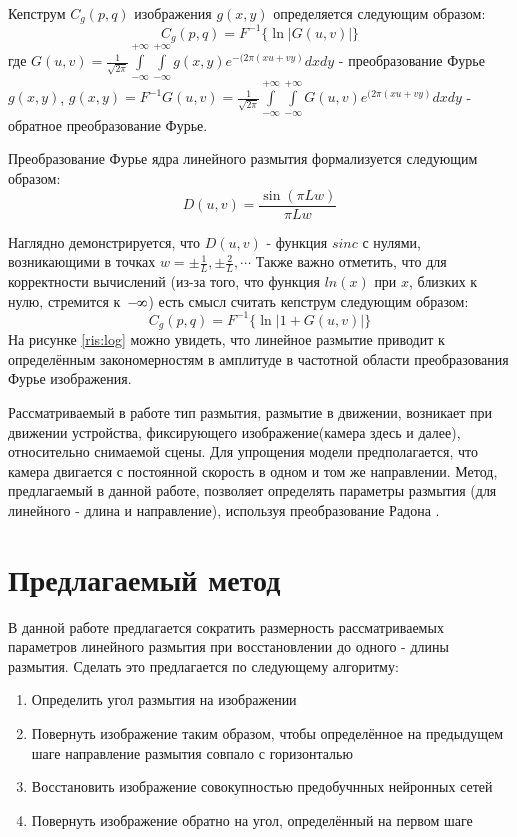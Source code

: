 Кепструм $C_{g}(p, q)$ изображения $g(x,y)$ определяется следующим образом:
\begin{equation}C_{g}(p, q)=F^{-1}\{\ln |G(u, v)|\}
\label{cepstrum_def}
\end{equation}
где  $G(u, v) = \frac{1}{\sqrt{2 \pi}} \int\limits_{-\infty}^{+\infty} \int\limits_{-\infty}^{+\infty} g(x, y) e^{-(2 \pi(x u+v y)} d x d y$  - преобразование Фурье $g(x,y)$,
 $g(x,y) = F^{-1}{G(u,v)} = \frac{1}{\sqrt{2 \pi}} \int\limits_{-\infty}^{+\infty} \int\limits_{-\infty}^{+\infty} G(u,v) e^{(2 \pi(x u+v y)} d x d y$  - обратное преобразование Фурье.

 Преобразование Фурье ядра линейного размытия формализуется следующим образом:
\begin{equation}
D(u, v)=\frac{\sin (\pi L w)}{\pi L w}
\label{motion_blur_fourier}
\end{equation}
\par
Наглядно демонстрируется, что $D(u,v)$ - функция $sinc$ с нулями, возникающими в точках $w=\pm \frac{1}{L}, \pm \frac{2}{L}, \cdots$
Также важно отметить, что для корректности вычислений (из-за того, что функция $ln(x)$ 
при $x$, близких к нулю, стремится к~$-\infinity$) есть смысл считать кепструм следующим образом:
$$C_{g}(p, q)=F^{-1}\{\ln |1+G(u, v)|\}$$
На рисунке \ref{ris:log} можно увидеть, что линейное размытие приводит к определённым закономерностям в амплитуде в частотной области преобразования Фурье изображения.
\par
Рассматриваемый в работе тип размытия, размытие в движении, возникает при движении устройства, фиксирующего изображение(камера здесь и далее), относительно снимаемой сцены. 
Для упрощения модели предполагается, что камера двигается с постоянной скорость в одном и том же направлении. Метод, предлагаемый в данной работе, позволяет определять параметры размытия (для линейного - длина и направление), используя преобразование Радона \cite{oliv}.


\newpage
\section{Предлагаемый метод}

В данной работе предлагается сократить размерность рассматриваемых параметров линейного размытия при восстановлении до одного - длины размытия. Сделать это предлагается по следующему алгоритму:
\begin{enumerate} 
    \item Определить угол размытия на изображении
    \item Повернуть изображение таким образом, чтобы определённое на предыдущем шаге направление размытия совпало с горизонталью
    \item Восстановить изображение совокупностью предобучнных нейронных сетей 
    \item Повернуть изображение обратно на угол, определённый на первом шаге
\end{enumerate}


